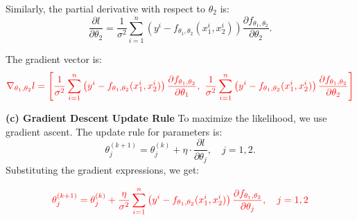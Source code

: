 Similarly, the partial derivative with respect to $\theta_2$ is:
$$ \frac{\partial l}{\partial \theta_2} = \frac{1}{\sigma^2} \sum_{i=1}^n \left( y^i - f_{\theta_1,\theta_2}(x^i_1, x^i_2) \right) \frac{\partial f_{\theta_1,\theta_2}}{\partial \theta_2}. $$

The gradient vector is:
\begin{equation*}
    \textcolor{red}{\nabla_{\theta_1, \theta_2} l = \left[ \frac{1}{\sigma^2} \sum_{i=1}^n \left( y^i - f_{\theta_1,\theta_2}(x^i_1, x^i_2) \right) \frac{\partial f_{\theta_1,\theta_2}}{\partial \theta_1}, \  \frac{1}{\sigma^2} \sum_{i=1}^n \left( y^i - f_{\theta_1,\theta_2}(x^i_1, x^i_2) \right) \frac{\partial f_{\theta_1,\theta_2}}{\partial \theta_2} \right]}
\end{equation*}



\textbf{(c) Gradient Descent Update Rule}  
To maximize the likelihood, we use gradient ascent. The update rule for parameters is:
$$ \theta_j^{(k+1)} = \theta_j^{(k)} + \eta \cdot \frac{\partial l}{\partial \theta_j}, \quad j=1,2. $$
Substituting the gradient expressions, we get:

\begin{equation*}
    \textcolor{red}{
        \theta_j^{(k+1)} = \theta_j^{(k)} + \frac{\eta}{\sigma^2} \sum_{i=1}^n \left( y^i - f_{\theta_1,\theta_2}(x^i_1, x^i_2) \right) \frac{\partial f_{\theta_1,\theta_2}}{\partial \theta_j}, \quad j=1,2
    }
\end{equation*}